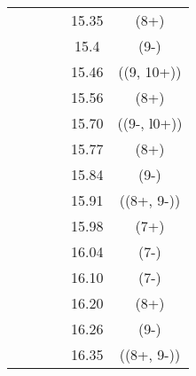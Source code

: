 \begin{center}
\begin{longtable}{cc cc cc}
  &   &   &   & 15.35 &   (8+)          \\
  &   &   &   & 15.4  &   (9-)          \\
  &   &   &   & 15.46 &   ((9, 10+))    \\
  &   &   &   & 15.56 &   (8+)          \\
  &   &   &   & 15.70 &   ((9-, l0+))   \\
  &   &   &   & 15.77 &   (8+)          \\
  &   &   &   & 15.84 &   (9-)          \\
  &   &   &   & 15.91 &   ((8+, 9-))    \\
  &   &   &   & 15.98 &   (7+)          \\
  &   &   &   & 16.04 &   (7-)          \\
  &   &   &   & 16.10 &   (7-)          \\
  &   &   &   & 16.20 &   (8+)          \\
  &   &   &   & 16.26 &   (9-)          \\
  &   &   &   & 16.35 &   ((8+, 9-))    \\



    \end{longtable}
\end{center}



%
% 
% 



